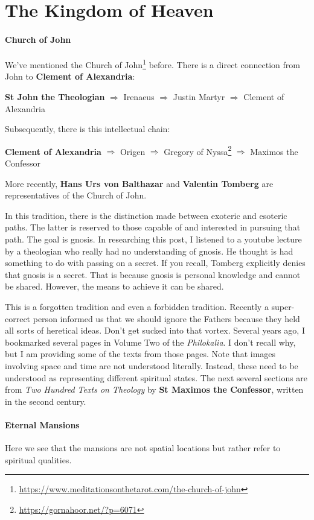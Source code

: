 \section{The Kingdom of Heaven}

\paragraph{Church of John}
We've mentioned the Church of John\footnote{\url{https://www.meditationsonthetarot.com/the-church-of-john}} before. There is a direct connection from John to
\textbf{Clement of Alexandria}:

\textbf{St John the Theologian} $\Rightarrow $ Irenaeus $\Rightarrow $ Justin Martyr $\Rightarrow $ Clement of
Alexandria

Subsequently, there is this intellectual chain:

\textbf{Clement of Alexandria} $\Rightarrow $ Origen $\Rightarrow $ Gregory of Nyssa\footnote{\url{https://gornahoor.net/?p=6071}} $\Rightarrow $ Maximos the
Confessor

More recently, \textbf{Hans Urs von Balthazar} and \textbf{Valentin Tomberg} are representatives of the Church of John.

In this tradition, there is the distinction made between exoteric and esoteric paths. The latter is reserved to those
capable of and interested in pursuing that path. The goal is gnosis. In researching this post, I listened to a youtube
lecture by a theologian who really had no understanding of gnosis. He thought is had something to do with passing on a
secret. If you recall, Tomberg explicitly denies that gnosis is a secret. That is because gnosis is personal knowledge
and cannot be shared. However, the means to achieve it can be shared.

This is a forgotten tradition and even a forbidden tradition. Recently a super-correct person informed us that we should
ignore the Fathers because they held all sorts of heretical ideas. Don't get sucked into that
vortex. Several years ago, I bookmarked several pages in Volume Two of the \emph{Philokalia}. I
don't recall why, but I am providing some of the texts from those pages. Note that images
involving space and time are not understood literally. Instead, these need to be understood as representing different
spiritual states. The next several sections are from \emph{Two Hundred Texts on Theology} by \textbf{St Maximos the
Confessor}, written in the second century.

\paragraph{Eternal Mansions}
Here we see that the mansions are not spatial locations but rather refer to spiritual qualities.

